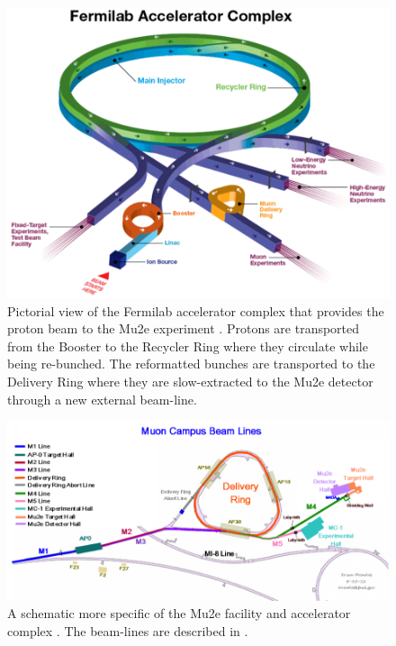 \documentclass[12pt,a4paper,openright, oneside, titlepage]{book} %
\begin{document}
\begin{figure}[h!]
\centering
\includegraphics[scale=0.5]{ProtonBeamlineArial_3D}
\caption[Fermilab accelerator complex]{Pictorial view of the Fermilab accelerator complex that provides the proton beam to the Mu2e experiment \cite{FNAL}. 
Protons are transported from the Booster to the Recycler Ring where they circulate while being re-bunched. 
The reformatted bunches are transported to the Delivery Ring where they are slow-extracted to the Mu2e detector through a new external beam-line.}
\label{_ProtonBeamlineArial}
\end{figure}

\begin{figure}[h!]
\centering
\includegraphics[scale=0.7]{ProtonBeamlineArial_sketch}
\caption[Mu2e delivery system]{A schematic more specific of the Mu2e facility and accelerator complex \cite{MTDR}. 
The beam-lines are described in \cite{MTDR}.}
\label{_ProtonBeamlineArial_sketch}
\end{figure}
\end{document}
